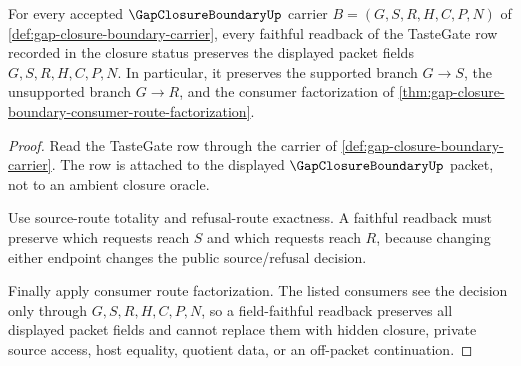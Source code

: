 \begin{theorem}
\label{thm:gap-closure-boundary-tastegate-fieldfaithful-readback}
For every accepted $\GapClosureBoundaryUp$ carrier $B=(G,S,R,H,C,P,N)$ of \autoref{def:gap-closure-boundary-carrier}, every faithful readback of the TasteGate row recorded in the closure status preserves the displayed packet fields $G,S,R,H,C,P,N$. In particular, it preserves the supported branch $G \longrightarrow S$, the unsupported branch $G \longrightarrow R$, and the consumer factorization of \autoref{thm:gap-closure-boundary-consumer-route-factorization}.
\end{theorem}
\begin{proof}
Read the TasteGate row through the carrier of \autoref{def:gap-closure-boundary-carrier}. The row is attached to the displayed $\GapClosureBoundaryUp$ packet, not to an ambient closure oracle.

Use source-route totality and refusal-route exactness. A faithful readback must preserve which requests reach $S$ and which requests reach $R$, because changing either endpoint changes the public source/refusal decision.

Finally apply consumer route factorization. The listed consumers see the decision only through $G,S,R,H,C,P,N$, so a field-faithful readback preserves all displayed packet fields and cannot replace them with hidden closure, private source access, host equality, quotient data, or an off-packet continuation.
\end{proof}
